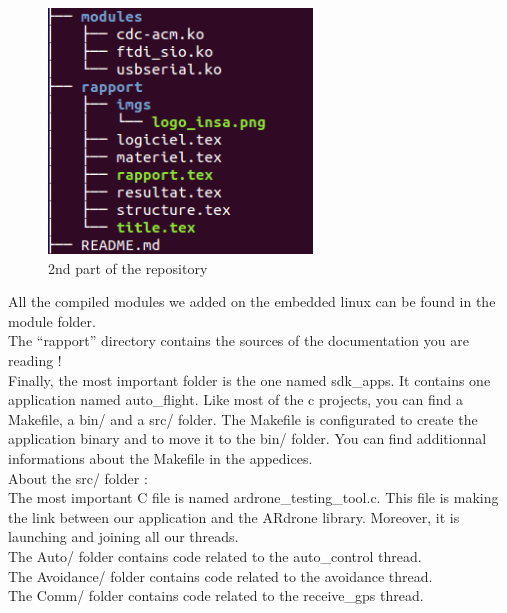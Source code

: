\begin{figure}[!h] 
\begin{center}
\includegraphics[width=7cm]{imgs/c2.png}
\caption{2nd part of the repository} 
\label{img1} 
\end{center}
\end{figure} 

All the compiled modules we added on the embedded linux can be found in the module folder.\\

The ``rapport'' directory contains the sources of the documentation you are reading !\\

Finally, the most important folder is the one named sdk\_apps. It contains one application named auto\_flight. Like most of the c projects, you can find a Makefile, a bin/ and a src/ folder. The Makefile is configurated to create the application binary and to move it to the bin/ folder. You can find additionnal informations about the Makefile in the appedices.\\

About the src/ folder :\\

The most important C file is named ardrone\_testing\_tool.c. This file is making the link between our application and the ARdrone library. Moreover, it is launching and joining all our threads.\\

The Auto/ folder contains code related to the auto\_control thread.\\

The Avoidance/ folder contains code related to the avoidance thread.\\

The Comm/ folder contains code related to the receive\_gps thread.\\

